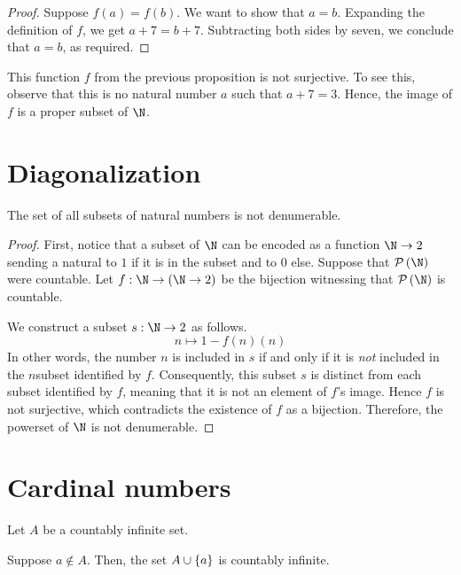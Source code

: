\documentclass[11pt,letterpaper]{article}
\begin{document}
\begin{proof}
    Suppose $f(a) = f(b)$. We want to show that $a = b$.
    Expanding the definition of $f$, we get $a + 7 = b + 7$.
    Subtracting both sides by seven, we conclude that $a = b$, as required.
\end{proof}

This function $f$ from the previous proposition is not surjective.
To see this, observe that this is no natural number $a$ such that $a + 7 = 3$.
Hence, the image of $f$ is a proper subset of $\N$.

\section{Diagonalization}

\begin{prop}
    The set of all subsets of natural numbers is not denumerable.
\end{prop}

\begin{proof}
    First, notice that a subset of $\N$ can be encoded as a function $\N \to 2$
    sending a natural to $1$ if it is in the subset and to $0$ else.
    Suppose that $\pset{\N}$ were countable.
    Let $f : \N \to (\N \to 2)$ be the bijection witnessing that $\pset{\N}$ is
    countable.

    We construct a subset $s : \N \to 2$ as follows.
    \begin{equation*}
        n \mapsto 1 - f(n)(n)
    \end{equation*}
    In other words, the number $n$ is included in $s$ if and only if it is
    \emph{not} included in the $n$\th subset identified by $f$.
    Consequently, this subset $s$ is distinct from each subset identified by
    $f$, meaning that it is not an element of $f$'s image.
    Hence $f$ is not surjective, which contradicts the existence of $f$ as a
    bijection.
    Therefore, the powerset of $\N$ is not denumerable.
\end{proof}

\section{Cardinal numbers}

Let $A$ be a countably infinite set.

\begin{prop}
    Suppose $a \notin A$.
    Then, the set $A \cup \left\{a\right\}$ is countably infinite.
\end{prop}
\end{document}

